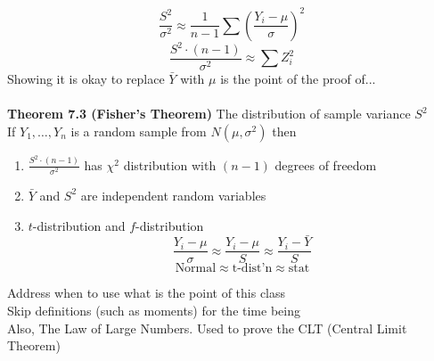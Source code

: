 \documentclass[12pt]{article}
\newcommand{\pars}[1]{\left( {#1} \right) }
\newcommand{\ybar}{\bar{Y}}
\newcommand{\Ndef}{N\left(\mu, \sigma^2\right)} %
\newcommand{\yn}{Y_1, \dots, Y_n}
\begin{document}
$$\frac{S^2}{\sigma^2} \approx \frac{1}{n-1}\sum \pars{\frac{Y_i - \mu}{\sigma}}^2$$
$$\frac{S^2\cdot(n-1)}{\sigma^2} \approx \sum Z_i^2$$
Showing it is okay to replace $\ybar$ with $\mu$ is the point of the proof of...
\\\\\textbf{Theorem 7.3 (Fisher's Theorem)} The distribution of sample variance $S^2$
\\If $\yn$ is a random sample from $\Ndef$ then 
\begin{enumerate}
        \item $\frac{S^2\cdot(n-1)}{\sigma^2}$ has $\chi^2$ distribution with $(n-1)$ degrees of freedom
        \item  $\bar{Y}$ and $S^2$ are independent random variables
        \item $t$-distribution and $f$-distribution
$$\frac{Y_i-\mu}{\sigma} \approx \frac{Y_i -\mu}{S} \approx \frac{Y_i - \bar{Y}}{S}$$
$$\text{Normal} \approx \text{t-dist'n} \approx \text{stat}$$
    \end{enumerate}
Address when to use what is the point of this class
\\Skip definitions (such as moments) for the time being
\\Also, The Law of Large Numbers. Used to prove the CLT (Central Limit Theorem)
\end{document}
